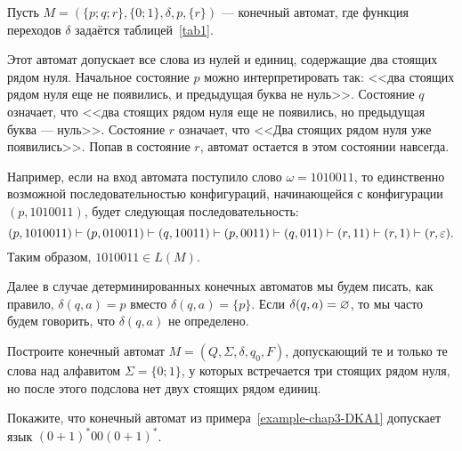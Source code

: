 \begin{myexample}
\label{example-chap3-DKA1}
Пусть $M=(\{p;q;r\},\{0;1\},\delta,p,\{r\})$ --- конечный автомат, где функция переходов $\delta$ задаётся таблицей~\ref{tab1}. 

Этот автомат допускает все слова из нулей и единиц, содержащие два стоящих рядом нуля. Начальное состояние $p$ можно интерпретировать так: <<два стоящих рядом нуля еще не появились, и предыдущая буква не нуль>>. Состояние $q$ означает, что <<два стоящих рядом нуля еще не появились, но предыдущая буква --- нуль>>. Состояние $r$ означает, что <<Два стоящих рядом нуля уже появились>>. Попав в состояние $r$, автомат остается в этом состоянии навсегда.

Например, если на вход автомата поступило слово $\omega=1010011$, то единственно возможной последовательностью конфигураций, начинающейся с конфигурации $(p,1010011)$, будет следующая последовательность:
\[	(p,1010011)\vdash(p,010011)\vdash(q,10011)\vdash(p,0011)\vdash(q,011)\vdash(r,11)\vdash(r,1)\vdash(r,\varepsilon).
\]
Таким образом, $1010011\in L(M)$.
\end{myexample}

Далее в случае детерминированных конечных автоматов мы будем писать, как правило, $\delta(q,a)=p$ вместо $\delta(q,a)=\{p\}$. Если $\delta(q,a)=\varnothing$, то мы часто будем говорить, что $\delta(q,a)$ не определено.

\begin{myproblem}
Построите конечный автомат $M=(Q,\Sigma,\delta,q_0,F)$, допускающий те и только те слова над алфавитом $\Sigma=\{0;1\}$, у которых встречается три стоящих рядом нуля, но после этого подслова нет двух стоящих рядом единиц.
\end{myproblem}

\begin{myproblem}
Покажите, что конечный автомат из примера~\ref{example-chap3-DKA1} допускает язык $(0+1)^*00(0+1)^*$.
\end{myproblem}

